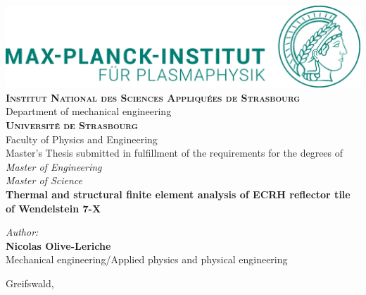 \documentclass[twoside]{report}
\begin{document}
\begin{titlepage}
    \centering
    \includegraphics[scale=0.075, angle=0]{figures/logo.jpg}\\
    \vskip2cm
    {\bfseries\normalsize
        \textsc{Institut National des Sciences Appliquées de Strasbourg}
        \\
    }
    {\small
        Department of mechanical engineering\\
    }
    {\bfseries\normalsize
        \textsc{Université de Strasbourg}
        \\
    }
    {\small
        Faculty of Physics and Engineering\\
    }
    \vskip3cm
    {\normalsize
        Master’s Thesis submitted in fulfillment of the requirements for the degrees of\\
        \it Master of Engineering\\
        \it Master of Science\\
    }
     \vskip1cm
    {\bfseries\huge
        Thermal and structural finite element analysis of ECRH reflector tile of Wendelstein 7-X\\
    }
    \vskip3cm
    \setlength{\columnsep}{0cm}
    \begin{multicols}{2}
        \begin{flushleft}
        {\it\small{Author:}}
        \\
        {\bfseries\large{Nicolas Olive-Leriche}}
        \\ 
        {\normalsize{Mechanical engineering/Applied physics and physical engineering}}
        \\
        \end{flushleft}
    \columnbreak
    \end{multicols}
    \vskip1cm
    {\small
        Greifswald, \the\year\\
    }
\end{titlepage}
\end{document}
